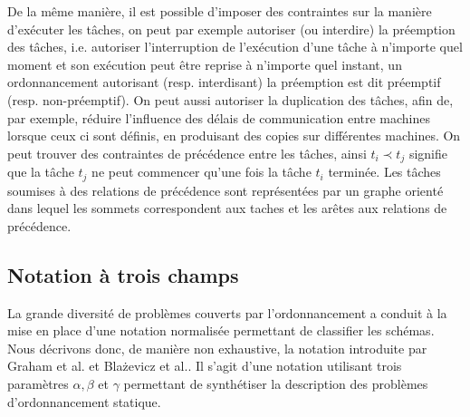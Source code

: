 \documentclass[a4paper,9pt]{report}
\begin{document}


De la même manière, il est possible d'imposer des contraintes sur la manière d'exécuter les tâches,
on peut par exemple autoriser (ou interdire) la préemption des tâches, i.e. autoriser l'interruption
de l'exécution d'une tâche à n'importe quel moment et son exécution peut être reprise à n'importe
quel instant, un ordonnancement autorisant (resp. interdisant) la préemption est dit préemptif
(resp. non-préemptif). On peut aussi autoriser la duplication des tâches, afin de, par exemple,
réduire l'influence des délais de communication entre machines lorsque ceux ci sont définis, en
produisant des copies sur différentes machines.
On peut trouver des contraintes de précédence entre les tâches, ainsi $t_i
\prec t_j$ signifie que la tâche $t_j$ ne peut commencer qu'une fois la tâche $t_i$ terminée. Les
tâches soumises à des relations de précédence sont représentées par un graphe orienté dans lequel
les sommets correspondent aux taches et les arêtes aux relations de précédence.


\subsection{Notation à trois champs}

La grande diversité de problèmes couverts par l'ordonnancement a conduit à la mise en place d'une
notation normalisée permettant de classifier les schémas. Nous décrivons donc, de manière non
exhaustive, la notation introduite par Graham et al. et Bla\.{z}evicz et al.. Il s'agit d'une
notation utilisant trois paramètres $\alpha, \beta$ et $\gamma$ permettant de synthétiser la
description des problèmes d'ordonnancement statique.
\end{document}
